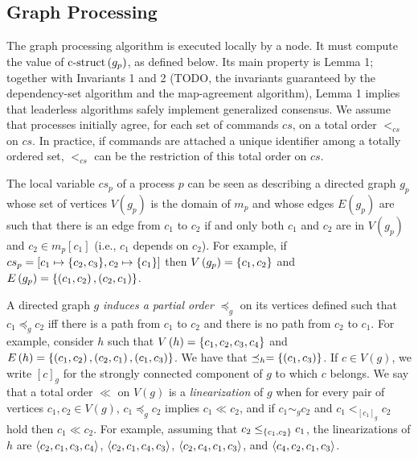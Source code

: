 \subsection{Graph Processing}
\label{graph-proc}

The graph processing algorithm is executed locally by a node. It must compute the value of $\operatorname{c-struct}\left( g_p \right)$, as defined below.
Its main property is Lemma 1; together with Invariants 1 and 2 (TODO, the invariants guaranteed by the dependency-set algorithm and the map-agreement algorithm), Lemma 1 implies that leaderless algorithms safely implement generalized consensus. 
We assume that processes initially agree, for each set of commands $cs$, on a total order $<_{cs}$ on $cs$.
In practice, if commands are attached a unique identifier among a totally ordered set, $<_{cs}$ can be the restriction of this total order on $cs$.

The local variable $cs_p$ of a process $p$ can be seen as describing a directed graph $g_p$ whose set of vertices $V\left( g_p \right)$ is the domain of $m_p$ and whose edges $E\left( g_p \right)$ are such that there is an edge from $c_1$ to $c_2$ if and only both $c_1$ and $c_2$ are in $V\left( g_p \right)$ and $c_2 \in m_p\left[ c_1 \right]$ (i.e., $c_1$ depends on $c_2$). For example, if $cs_p = \left[ c_1 \mapsto \aset{c_2,c_3}, c_2 \mapsto \aset{c_1} \right]$ then $V\left(
g_p \right) = \left\{c_1,c_2\right\}$ and $E\left( g_p \right) = \left\{\left( c_1,c_2 \right),\left( c_2,c_1 \right)\right\}$.

A directed graph $g$ \emph{induces a partial order} $\preceq_g$ on its vertices defined such that $c_1 \preceq_g c_2$ iff there is a path from $c_1$ to $c_2$ and there is no path from $c_2$ to $c_1$.
For example, consider $h$ such that $V\left( h \right)=\left\{c_1,c_2,c_3,c_4\right\}$ and $E\left( h \right)=\left\{\left( c_1,c_2 \right),\left( c_2,c_1 \right),\left( c_1,c_3 \right)\right\}$. 
We have that $\preceq_h = \left\{\left( c_1,c_3 \right)\right\}$. %
If $c\in V\left( g \right)$, we write $\left[ c \right]_g$ for the strongly connected component of $g$ to which $c$ belongs. 
We say that a total order $\ll$ on $V\left( g \right)$ is a \emph{linearization} of $g$ when for every pair of vertices $c_1,c_2\in V\left( g \right)$, $c_1 \preceq_g c_2$ implies $c_1 \ll c_2$, and if $c_1 \sim_g c_2$ and $ c_1 <_{\left[ c_1 \right]_g} c_2$ hold then $c_1 \ll c_2$. For example, assuming that $c_2 \leq_{\left\{c_1,c_2\right\}} c_1$, the linearizations of $h$ are $\left\langle c_2,c_1,c_3,c_4\right\rangle$, $\left\langle c_2,c_1,c_4,c_3\right\rangle$, $\left\langle c_2,c_4,c_1,c_3\right\rangle$, and $\left\langle c_4,c_2,c_1,c_3\right\rangle$.

